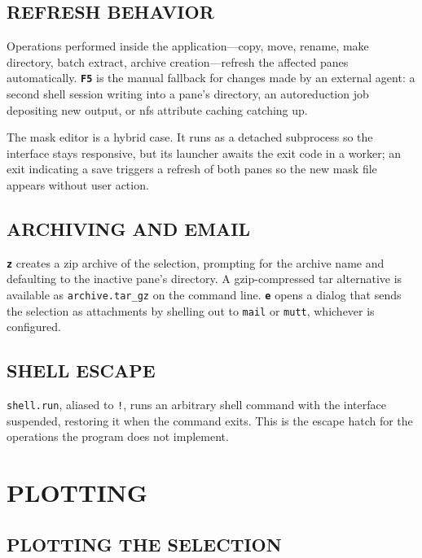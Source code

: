 \documentclass[tm]{ornltm}
\newcommand{\cmd}[1]{\texttt{#1}}
\newcommand{\key}[1]{\textbf{\texttt{#1}}}
\begin{document}
\subsection{REFRESH BEHAVIOR}

Operations performed inside the application---copy, move, rename, make
directory, batch extract, archive creation---refresh the affected panes
automatically. \key{F5} is the manual fallback for changes made by an external
agent: a second shell session writing into a pane's directory, an autoreduction
job depositing new output, or \ac{nfs} attribute caching catching up.

The mask editor is a hybrid case. It runs as a detached subprocess so the
interface stays responsive, but its launcher awaits the exit code in a worker;
an exit indicating a save triggers a refresh of both panes so the new mask file
appears without user action.

\subsection{ARCHIVING AND EMAIL}

\key{z} creates a zip archive of the selection, prompting for the archive name
and defaulting to the inactive pane's directory. A gzip-compressed tar
alternative is available as \cmd{archive.tar\_gz} on the command line. \key{e}
opens a dialog that sends the selection as attachments by shelling out to
\texttt{mail} or \texttt{mutt}, whichever is configured.

\subsection{SHELL ESCAPE}

\cmd{shell.run}, aliased to \texttt{!}, runs an arbitrary shell command with the
interface suspended, restoring it when the command exits. This is the escape
hatch for the operations the program does not implement.

\section{PLOTTING}
\label{sec:plot}

\subsection{PLOTTING THE SELECTION}
\end{document}
